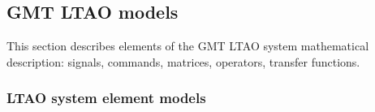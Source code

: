 
\subsection{GMT LTAO models}
\label{subsec:LTAO-models}

\mbox{}

This section describes elements of the GMT LTAO system mathematical
description: signals, commands, matrices, operators, transfer functions.

\subsubsection{LTAO system element models}
\label{subsubsec:ltao-elements}

